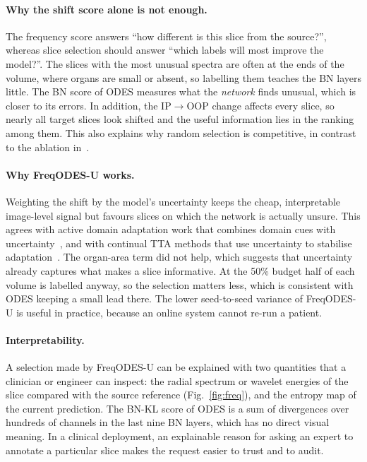 \documentclass[a4paper,fleqn]{cas-dc}
\begin{document}
\paragraph{Why the shift score alone is not enough.} The frequency score answers ``how different is this slice from the source?'', whereas slice selection should answer ``which labels will most improve the model?''. The slices with the most unusual spectra are often at the ends of the volume, where organs are small or absent, so labelling them teaches the BN layers little. The BN score of ODES measures what the \emph{network} finds unusual, which is closer to its errors. In addition, the IP$\rightarrow$OOP change affects every slice, so nearly all target slices look shifted and the useful information lies in the ranking among them. This also explains why random selection is competitive, in contrast to the ablation in~\cite{islam2025odes}.

\paragraph{Why FreqODES-U works.} Weighting the shift by the model's uncertainty keeps the cheap, interpretable image-level signal but favours slices on which the network is actually unsure. This agrees with active domain adaptation work that combines domain cues with uncertainty~\cite{xie2022ripu,safaei2025certainty,huynh2026category}, and with continual TTA methods that use uncertainty to stabilise adaptation~\cite{zhu2025uncertainty}. The organ-area term did not help, which suggests that uncertainty already captures what makes a slice informative. At the 50\% budget half of each volume is labelled anyway, so the selection matters less, which is consistent with ODES keeping a small lead there. The lower seed-to-seed variance of FreqODES-U is useful in practice, because an online system cannot re-run a patient.

\paragraph{Interpretability.} A selection made by FreqODES-U can be explained with two quantities that a clinician or engineer can inspect: the radial spectrum or wavelet energies of the slice compared with the source reference (Fig.~\ref{fig:freq}), and the entropy map of the current prediction. The BN-KL score of ODES is a sum of divergences over hundreds of channels in the last nine BN layers, which has no direct visual meaning. In a clinical deployment, an explainable reason for asking an expert to annotate a particular slice makes the request easier to trust and to audit.
\end{document}

